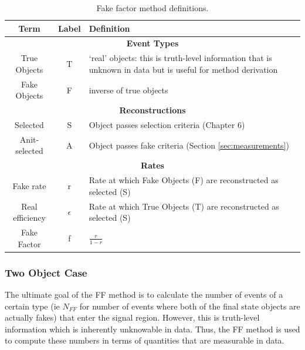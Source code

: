 \begin{table}[htb!]
    \centering
    \begin{tabular}{|c|c|p{4in}|}
    \hline
    \textbf{Term} & \textbf{Label} & \textbf{Definition} \\
    \hline
    \multicolumn{3}{|c|}{\textbf{Event Types}}\\
    \hline
    True Objects  & T & `real' objects: this is truth-level information that is unknown in data but is useful for method derivation \\
    Fake Objects  & F & inverse of true objects \\
    \hline
    \multicolumn{3}{|c|}{\textbf{Reconstructions}}\\
    \hline
    Selected & S & Object passes selection criteria (Chapter 6)\\
    Anit-selected & A & Object passes fake criteria (Section \ref{sec:measurements})\\
    \hline
    \multicolumn{3}{|c|}{\textbf{Rates}}\\
    \hline
    Fake rate & r & Rate at which Fake Objects (F) are reconstructed as selected (S)\\
    Real efficiency & $\epsilon$ & Rate at which True Objects (T) are reconstructed as selected (S)\\
    Fake Factor & f & $\frac{r}{1-r}$ \\
    \hline
    \end{tabular}
    \caption{Fake factor method definitions.}
    \label{tab:ff_defs}
\end{table}

\subsubsection{Two Object Case}\label{sec:2_obj}
The ultimate goal of the FF method is to calculate the number of events of a certain type (ie $N_{FF}$ for number of events where both of the final state objects are actually fakes) that enter the signal region. However, this is truth-level information which is inherently unknowable in data. Thus, the FF method is used to compute these numbers in terms of quantities that are measurable in data.\\

